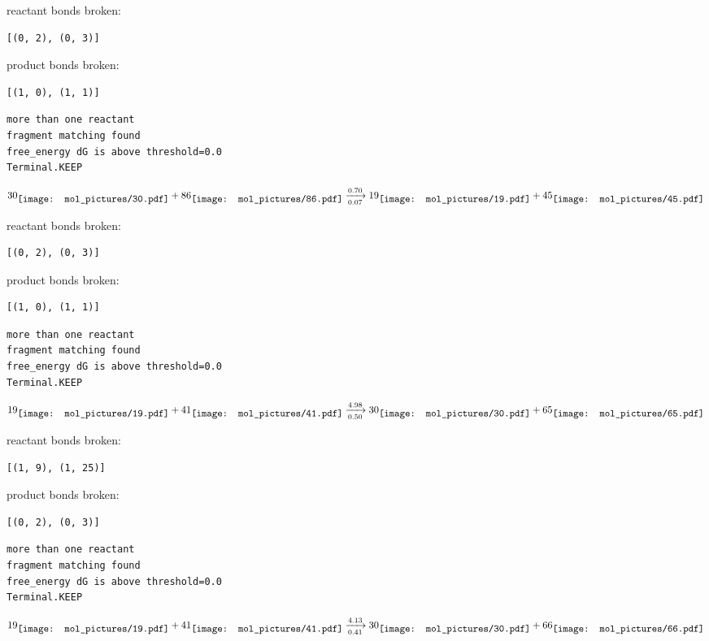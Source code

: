 \documentclass{article}
\begin{document}
reactant bonds broken:\begin{verbatim}
[(0, 2), (0, 3)]
\end{verbatim}
product bonds broken:\begin{verbatim}
[(1, 0), (1, 1)]
\end{verbatim}




\vspace{1cm}
\begin{verbatim}
more than one reactant
fragment matching found
free_energy dG is above threshold=0.0
Terminal.KEEP
\end{verbatim}
$$
30
\raisebox{-.5\height}{\texttt{[image: mol\_pictures/30.pdf]}}
+
86
\raisebox{-.5\height}{\texttt{[image: mol\_pictures/86.pdf]}}
\xrightarrow[0.07]{0.70}
19
\raisebox{-.5\height}{\texttt{[image: mol\_pictures/19.pdf]}}
+
45
\raisebox{-.5\height}{\texttt{[image: mol\_pictures/45.pdf]}}
$$


reactant bonds broken:\begin{verbatim}
[(0, 2), (0, 3)]
\end{verbatim}
product bonds broken:\begin{verbatim}
[(1, 0), (1, 1)]
\end{verbatim}




\vspace{1cm}
\begin{verbatim}
more than one reactant
fragment matching found
free_energy dG is above threshold=0.0
Terminal.KEEP
\end{verbatim}
$$
19
\raisebox{-.5\height}{\texttt{[image: mol\_pictures/19.pdf]}}
+
41
\raisebox{-.5\height}{\texttt{[image: mol\_pictures/41.pdf]}}
\xrightarrow[0.50]{4.98}
30
\raisebox{-.5\height}{\texttt{[image: mol\_pictures/30.pdf]}}
+
65
\raisebox{-.5\height}{\texttt{[image: mol\_pictures/65.pdf]}}
$$


reactant bonds broken:\begin{verbatim}
[(1, 9), (1, 25)]
\end{verbatim}
product bonds broken:\begin{verbatim}
[(0, 2), (0, 3)]
\end{verbatim}




\vspace{1cm}
\begin{verbatim}
more than one reactant
fragment matching found
free_energy dG is above threshold=0.0
Terminal.KEEP
\end{verbatim}
$$
19
\raisebox{-.5\height}{\texttt{[image: mol\_pictures/19.pdf]}}
+
41
\raisebox{-.5\height}{\texttt{[image: mol\_pictures/41.pdf]}}
\xrightarrow[0.41]{4.13}
30
\raisebox{-.5\height}{\texttt{[image: mol\_pictures/30.pdf]}}
+
66
\raisebox{-.5\height}{\texttt{[image: mol\_pictures/66.pdf]}}
$$
\end{document}
